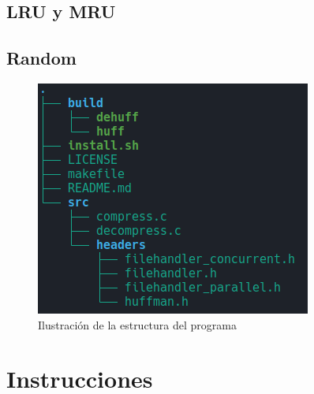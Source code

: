 \documentclass{report}
\begin{document}
\subsection{LRU y MRU}
\subsection{Random}

\begin{figure}[h]
    \centering
    \includegraphics[width=0.8\linewidth]{figuras/estructura.png}
    \caption{Ilustración de la estructura del programa}
    \label{fig:estructura}
\end{figure}

\section{Instrucciones}
\end{document}
